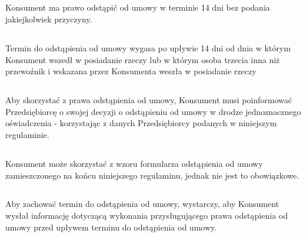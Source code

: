 
			\subsection{} Konsument ma prawo odstąpić od umowy w terminie 14 dni bez podania jakiejkolwiek przyczyny.
			
			\subsection{} Termin do odstąpienia od umowy wygasa po upływie 14 dni od dnia w którym Konsument wszedł	w posiadanie rzeczy lub w którym osoba trzecia inna niż przewoźnik i wskazana przez Konsumenta weszła w posiadanie rzeczy
			
			\subsection{} Aby skorzystać z prawa odstąpienia od umowy, Konsument musi poinformować Przedsiębiorcę o swojej decyzji o odstąpieniu od umowy w drodze jednoznacznego oświadczenia - korzystając z danych Przedsiębiorcy podanych w niniejszym regulaminie.

			\subsection{} Konsument może skorzystać z wzoru formularza odstąpienia od umowy zamieszczonego na końcu niniejszego regulaminu, jednak nie jest to obowiązkowe.

			\subsection{} Aby zachować termin do odstąpienia od umowy, wystarczy, aby Konsument wysłał informację dotyczącą wykonania przysługującego prawa odstąpienia od umowy przed upływem terminu do odstąpienia od umowy.
	
